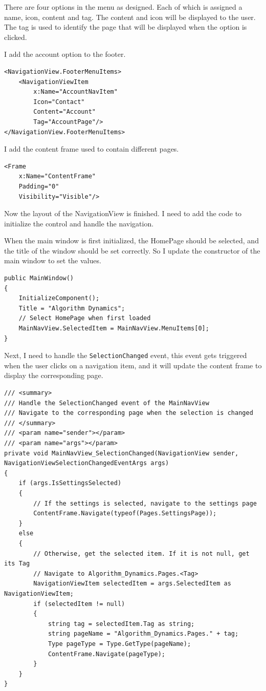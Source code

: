 \documentclass[a4paper]{report}
\newcommand{\code}{\texttt}
\begin{document}
There are four options in the menu as designed. Each of which is assigned a name, icon, content and tag. The content and icon will be displayed to the user. The tag is used to identify the page that will be displayed when the option is clicked.

I add the account option to the footer.

\begin{verbatim}
<NavigationView.FooterMenuItems>
    <NavigationViewItem
        x:Name="AccountNavItem"
        Icon="Contact"
        Content="Account"
        Tag="AccountPage"/>
</NavigationView.FooterMenuItems>
\end{verbatim}

I add the content frame used to contain different pages.

\begin{verbatim}
<Frame
    x:Name="ContentFrame"
    Padding="0"
    Visibility="Visible"/>
\end{verbatim}

Now the layout of the NavigationView is finished. I need to add the code to initialize the control and handle the navigation.

When the main window is first initialized, the HomePage should be selected, and the title of the window should be set correctly. So I update the constructor of the main window to set the values.

\begin{verbatim}
public MainWindow()
{
    InitializeComponent();
    Title = "Algorithm Dynamics";
    // Select HomePage when first loaded
    MainNavView.SelectedItem = MainNavView.MenuItems[0];
}
\end{verbatim}

Next, I need to handle the \code{SelectionChanged} event, this event gets triggered when the user clicks on a navigation item, and it will update the content frame to display the corresponding page.

\begin{verbatim}
/// <summary>
/// Handle the SelectionChanged event of the MainNavView
/// Navigate to the corresponding page when the selection is changed
/// </summary>
/// <param name="sender"></param>
/// <param name="args"></param>
private void MainNavView_SelectionChanged(NavigationView sender, NavigationViewSelectionChangedEventArgs args)
{
    if (args.IsSettingsSelected)
    {
        // If the settings is selected, navigate to the settings page
        ContentFrame.Navigate(typeof(Pages.SettingsPage));
    }
    else
    {
        // Otherwise, get the selected item. If it is not null, get its Tag
        // Navigate to Algorithm_Dynamics.Pages.<Tag>
        NavigationViewItem selectedItem = args.SelectedItem as NavigationViewItem;
        if (selectedItem != null)
        {
            string tag = selectedItem.Tag as string;
            string pageName = "Algorithm_Dynamics.Pages." + tag;
            Type pageType = Type.GetType(pageName);
            ContentFrame.Navigate(pageType);
        }
    }
}
\end{verbatim}
\end{document}
